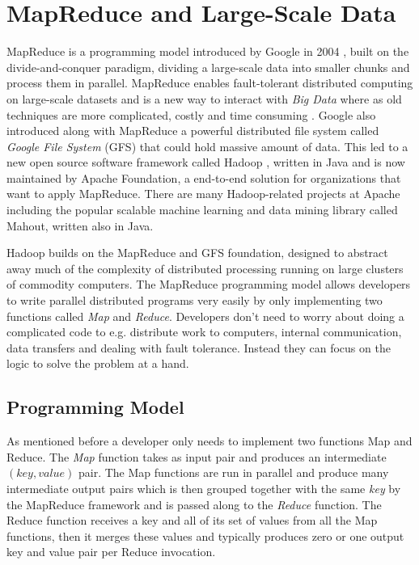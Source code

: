 \section{MapReduce and Large-Scale Data}
MapReduce is a programming model introduced by Google in 2004 \citep{Dean:2004}, built on the divide-and-conquer paradigm, dividing a large-scale data into smaller chunks and process them in parallel. MapReduce enables fault-tolerant distributed computing on large-scale datasets and is a new way to interact with \textit{Big Data} where as old techniques are more complicated, costly and time consuming \citep{Dean:2004, schneider2012Hadoop}. Google also introduced along with MapReduce a powerful distributed file system called \textit{Google File System} (GFS) that could hold massive amount of data. This led to a new open source software framework called Hadoop \citep{bialecki2005hadoop}, written in Java and is now maintained by Apache Foundation, a end-to-end solution for organizations that want to apply MapReduce. There are many Hadoop-related projects at Apache including the popular scalable machine learning and data mining library called Mahout, written also in Java. 

Hadoop builds on the MapReduce and GFS foundation, designed to abstract away much of the complexity of distributed processing running on large clusters of commodity computers. The MapReduce programming model allows developers to write parallel distributed programs very easily by only implementing two functions called \textit{Map} and \textit{Reduce}. Developers don't need to worry about doing a complicated code to e.g. distribute work to computers, internal communication, data transfers and dealing with fault tolerance. Instead they can focus on the logic to solve the problem at a hand.

\subsection{Programming Model}
As mentioned before a developer only needs to implement two functions Map and Reduce. The \textit{Map} function takes as input pair and produces an intermediate $(key,value)$ pair. The Map functions are run in parallel and produce many intermediate output pairs which is then grouped together with the same \textit{key} by the MapReduce framework and is passed along to the \textit{Reduce} function. The Reduce function receives a key and all of its set of values from all the Map functions, then it merges these values and typically produces zero or one output key and value pair per Reduce invocation.

